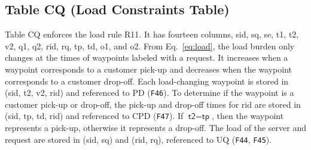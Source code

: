 \subsection{Table CQ (Load Constraints Table)}
Table CQ enforces the load rule R11. It has fourteen columns, \textsf{sid},
\textsf{sq}, \textsf{se}, \textsf{t1}, \textsf{t2}, \textsf{v2}, \textsf{q1},
\textsf{q2}, \textsf{rid}, \textsf{rq}, \textsf{tp}, \textsf{td}, \textsf{o1},
and \textsf{o2}.  From Eq.~\ref{eq:load}, the load burden only changes at the
times of waypoints labeled with a request. It increases when a waypoint
corresponds to a customer pick-up and decreases when the waypoint corresponds
to a customer drop-off. Each load-changing waypoint is stored in (\textsf{sid},
\textsf{t2}, \textsf{v2}, \textsf{rid}) and referenced to PD ({\tt{}F46}).  To
determine if the waypoint is a customer pick-up or drop-off, the pick-up and
drop-off times for \textsf{rid} are stored in (\textsf{sid}, \textsf{tp},
\textsf{td}, \textsf{rid}) and referenced to CPD ({\tt{}F47}).  If
$\textsf{t2}=\textsf{tp}$, then the waypoint represents a pick-up, otherwise it
represents a drop-off. The load of the server and request are stored in
(\textsf{sid}, \textsf{sq}) and (\textsf{rid}, \textsf{rq}), referenced to UQ
({\tt{}F44}, {\tt{}F45}).


